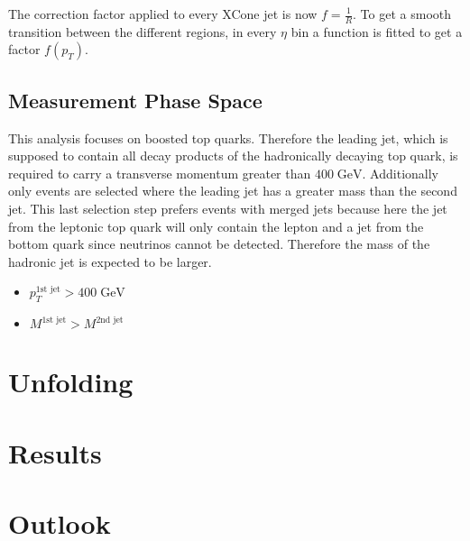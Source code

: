 	The correction factor applied to every XCone jet is now $f = \frac{1}{R}$. To get a smooth transition between the different regions, in every $\eta$ bin a function is fitted to get a factor $f(p_T)$.
\subsection{Measurement Phase Space}
\label{sec:FinalSel}
	This analysis focuses on boosted top quarks. Therefore the leading jet, which is supposed to contain all decay products of the hadronically decaying top quark, is required to carry a transverse momentum greater than $400\;\text{GeV}$. Additionally only events are selected where the leading jet has a greater mass than the second jet. This last selection step prefers events with merged jets because here the jet from the leptonic top quark will only contain the lepton and a jet from the bottom quark since neutrinos cannot be detected. Therefore the mass of the hadronic jet is expected to be larger.
	\begin{itemize}
	\item $p_T^{\text{1st jet}} > 400\;\text{GeV}$ 
	\item $M^{\text{1st jet}} > M^{\text{2nd jet}}$
	\end{itemize}

\section{Unfolding}
\section{Results}
\section{Outlook}

\label{sec:results}